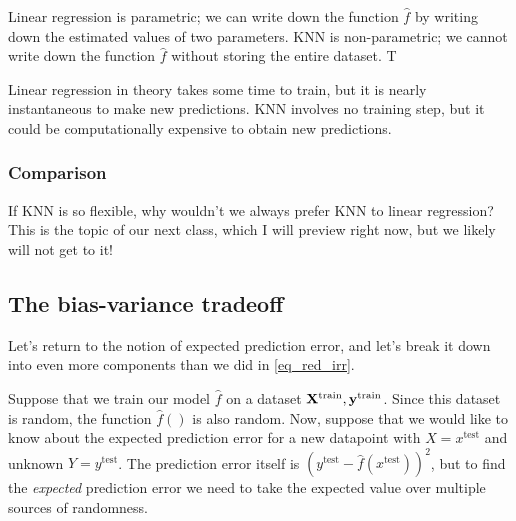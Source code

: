 \documentclass[titlepage,10pt]{scrartcl}
\newcommand{\xte}{x^{\mathrm{test}}}
\newcommand{\yte}{y^{\mathrm{test}}}
\begin{document}
Linear regression is parametric; we can write down the function $\hat{f}$ by writing down the estimated values of two parameters. KNN is non-parametric; we cannot write down the function $\hat{f}$ without storing the entire dataset. T

Linear regression in theory takes some time to train, but it is nearly instantaneous to make new predictions. KNN involves no training step, but it could be computationally expensive to obtain new predictions. 

\subsubsection{Comparison}

If KNN is so flexible, why wouldn't we always prefer KNN to linear regression? This is the topic of our next class, which I will preview right now, but we likely will not get to it!  

\subsection{The bias-variance tradeoff}

Let's return to the notion of expected prediction error, and let's break it down into even more components than we did in \eqref{eq_red_irr}. 

Suppose that we train our model $\hat{f}$ on a dataset $\bold{X}^\mathrm{train}, \bold{y}^\mathrm{train}$. Since this dataset is random, the function $\hat{f}()$ is also random. Now, suppose that we would like to know about the expected prediction error for a new datapoint with $X=x^\mathrm{test}$ and unknown $Y=\yte$. The prediction error itself is 
$
\left(\yte - \hat{f}(\xte)\right)^2
$, but to find the \emph{expected} prediction error we need to take the expected value over multiple sources of randomness. 
\end{document}
